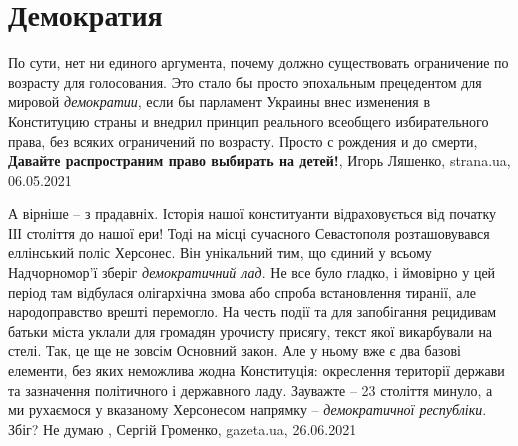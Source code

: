  
 
 
 
 
\chapter{Демократия}
\label{sec:slova.demokratia}

По сути, нет ни единого аргумента, почему должно существовать ограничение по
возрасту для голосования. Это стало бы просто эпохальным прецедентом для
мировой \emph{демократии}, если бы парламент Украины внес изменения в
Конституцию страны и внедрил принцип реального всеобщего избирательного права,
без всяких ограничений по возрасту.  Просто с рождения и до смерти,
\textbf{Давайте распространим право выбирать на детей!},
Игорь Ляшенко, strana.ua, 06.05.2021

А вірніше – з прадавніх. Історія нашої конституанти відраховується від початку
ІІІ століття до нашої ери! Тоді на місці сучасного Севастополя розташовувався
еллінський поліс Херсонес. Він унікальний тим, що єдиний у всьому Надчорномор'ї
зберіг \emph{демократичний лад}. Не все було гладко, і ймовірно у цей період
там відбулася олігархічна змова або спроба встановлення тиранії, але
народоправство врешті перемогло. На честь події та для запобігання рецидивам
батьки міста уклали для громадян урочисту присягу, текст якої викарбували на
стелі. Так, це ще не зовсім Основний закон. Але у ньому вже є два базові
елементи, без яких неможлива жодна Конституція: окреслення території держави та
зазначення політичного і державного ладу.  Зауважте – 23 століття минуло, а ми
рухаємося у вказаному Херсонесом напрямку – \emph{демократичної республіки}.
Збіг? Не думаю
, 
Сергій Громенко, gazeta.ua, 26.06.2021


